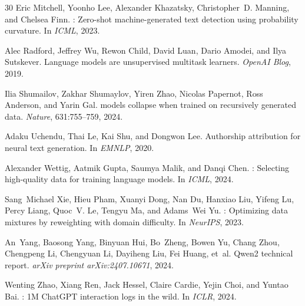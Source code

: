 \documentclass[11pt,a4paper]{article}
\begin{document}
\begin{thebibliography}{30}
Eric Mitchell, Yoonho Lee, Alexander Khazatsky, Christopher~D. Manning, and Chelsea Finn.
: Zero-shot machine-generated text detection using probability curvature.
\newblock In \emph{ICML}, 2023.

Alec Radford, Jeffrey Wu, Rewon Child, David Luan, Dario Amodei, and Ilya Sutskever.
\newblock Language models are unsupervised multitask learners.
\newblock \emph{OpenAI Blog}, 2019.

Ilia Shumailov, Zakhar Shumaylov, Yiren Zhao, Nicolas Papernot, Ross Anderson, and Yarin Gal.
 models collapse when trained on recursively generated data.
\newblock \emph{Nature}, 631:755--759, 2024.

Adaku Uchendu, Thai Le, Kai Shu, and Dongwon Lee.
\newblock Authorship attribution for neural text generation.
\newblock In \emph{EMNLP}, 2020.

Alexander Wettig, Aatmik Gupta, Saumya Malik, and Danqi Chen.
: Selecting high-quality data for training language models.
\newblock In \emph{ICML}, 2024.

Sang~Michael Xie, Hieu Pham, Xuanyi Dong, Nan Du, Hanxiao Liu, Yifeng Lu, Percy Liang, Quoc~V. Le, Tengyu Ma, and Adams~Wei Yu.
: Optimizing data mixtures by reweighting with domain difficulty.
\newblock In \emph{NeurIPS}, 2023.

An~Yang, Baosong Yang, Binyuan Hui, Bo~Zheng, Bowen Yu, Chang Zhou, Chengpeng Li, Chengyuan Li, Dayiheng Liu, Fei Huang, et~al.
\newblock Qwen2 technical report.
\newblock \emph{arXiv preprint arXiv:2407.10671}, 2024.

Wenting Zhao, Xiang Ren, Jack Hessel, Claire Cardie, Yejin Choi, and Yuntao Bai.
: 1{M} {ChatGPT} interaction logs in the wild.
\newblock In \emph{ICLR}, 2024.

\end{thebibliography}
\end{document}
